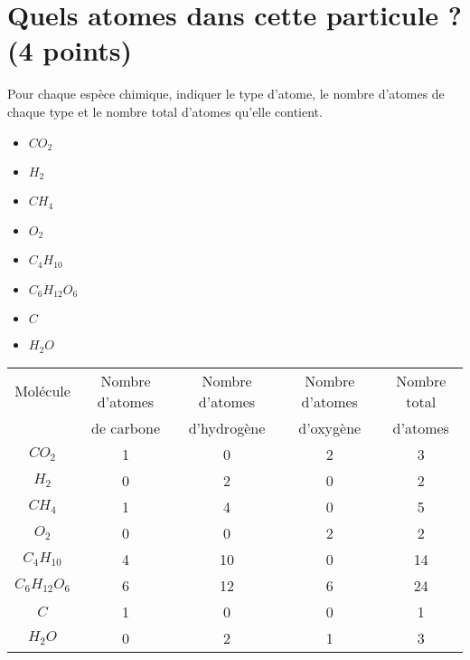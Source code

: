 \section{Quels atomes dans cette particule ? (4 points)}\label{ex:particule}



\begin{questions}
	\question[4] Pour chaque espèce chimique, indiquer le type d'atome, le nombre d'atomes de chaque type et le nombre total d'atomes qu'elle contient.
	 
	\begin{multicols}{4}
		\begin{itemize}
			\item $CO_2$
			\item $H_2$
			\item $CH_4$
			\item $O_2$
			\item $C_4H_{10} $
			\item $C_6H_{12} O_6$
			\item $C$
			\item $H_2O$
		\end{itemize}
	\end{multicols}

	\begin{solution}
		\begin{tabular}{|@{\ }c@{\ }|@{\ }c@{\ }|@{\ }c@{\ }|@{\ }c@{\ }|@{\ }c@{\ }|}
			\hline
			Molécule         & Nombre d'atomes & Nombre d'atomes & Nombre d'atomes & Nombre total \\ 
			& de carbone      & d'hydrogène     & d'oxygène       & d'atomes         \\ \hline
			$CO_2$           & 1               & 0               & 2               & 3               \\ \hline
			$H_2$            & 0               & 2               & 0               & 2               \\ \hline
			$CH_4$           & 1               & 4               & 0               & 5               \\ \hline
			$O_2$            & 0               & 0               & 2               & 2               \\ \hline
			$C_4H_{10}$      & 4               & 10              & 0               & 14              \\ \hline
			$C_6H_{12}O_{6}$ & 6               & 12              & 6               & 24              \\ \hline
			$C$              & 1               & 0               & 0               & 1               \\ \hline
			$H_2O$           & 0               & 2               & 1               & 3               \\ \hline
		\end{tabular}
	\end{solution}
	
\end{questions}